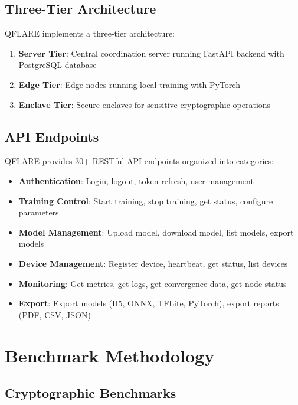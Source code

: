 \documentclass[12pt,a4paper]{article}
\begin{document}
\subsection{Three-Tier Architecture}

QFLARE implements a three-tier architecture:

\begin{enumerate}
    \item \textbf{Server Tier}: Central coordination server running FastAPI backend with PostgreSQL database
    \item \textbf{Edge Tier}: Edge nodes running local training with PyTorch
    \item \textbf{Enclave Tier}: Secure enclaves for sensitive cryptographic operations
\end{enumerate}

\subsection{API Endpoints}

QFLARE provides 30+ RESTful API endpoints organized into categories:

\begin{itemize}
    \item \textbf{Authentication}: Login, logout, token refresh, user management
    \item \textbf{Training Control}: Start training, stop training, get status, configure parameters
    \item \textbf{Model Management}: Upload model, download model, list models, export models
    \item \textbf{Device Management}: Register device, heartbeat, get status, list devices
    \item \textbf{Monitoring}: Get metrics, get logs, get convergence data, get node status
    \item \textbf{Export}: Export models (H5, ONNX, TFLite, PyTorch), export reports (PDF, CSV, JSON)
\end{itemize}

\section{Benchmark Methodology}
\label{appendix:methodology}

\subsection{Cryptographic Benchmarks}
\end{document}
